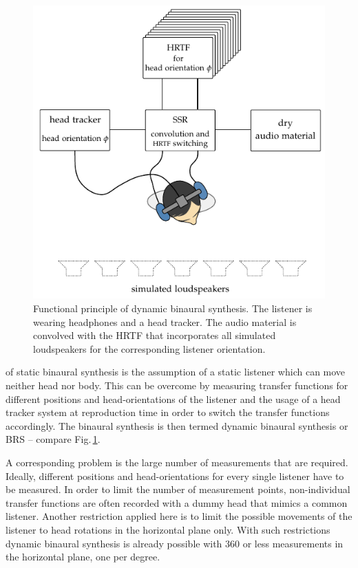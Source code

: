 \begin{figure}
    \centering
    \includegraphics{fig4_01/fig4_01}
    \caption{Functional principle of dynamic binaural synthesis. The listener is
    wearing headphones and a head tracker. The audio material is convolved with
    the \ac{HRTF} that incorporates all simulated loudspeakers for the
    corresponding listener orientation.
    }
    \label{fig:dynamic_binaural_synthesis}
\end{figure}


 of static binaural synthesis is the assumption of a static
listener which can move neither head nor body. This can be overcome by measuring
transfer functions for different positions and head-orientations of the listener
and the usage of a head tracker system at reproduction time in order to switch
the transfer functions accordingly. The binaural synthesis is then termed dynamic
binaural synthesis or \ac{BRS}\autocite{Horbach1999a} -- compare
Fig.\,\ref{fig:dynamic_binaural_synthesis}.

A corresponding problem is the large number of measurements that are required.
Ideally, different positions and head-orientations for every single listener have to be
measured. In order to limit the number of measurement points,
non-individual transfer functions are often recorded with a dummy head that
mimics a common listener. Another restriction applied here is to limit the possible movements
of the listener
to head rotations in the horizontal plane only.
With such restrictions dynamic binaural synthesis is
already possible with 360 or less measurements in the horizontal plane, one per
degree.

